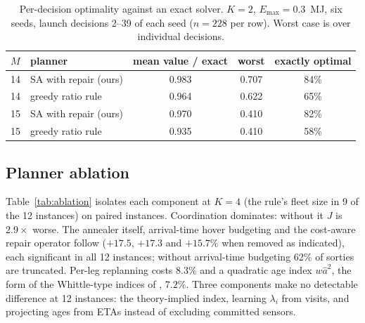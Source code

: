 \documentclass[journal,outdir=./]{IEEEtran}
\newcommand{\Emax}{E_{\max}}
\begin{document}
\begin{table}[t]\centering
\footnotesize\setlength{\tabcolsep}{3pt}
\caption{Per-decision optimality against an exact solver. $K=2$, $\Emax=0.3$~MJ, six seeds, launch decisions 2--39 of each seed ($n=228$ per row). Worst case is over individual decisions.}
\label{tab:cert}
\begin{tabular}{llccc}
\toprule
$M$ & planner & mean value / exact & worst & exactly optimal\\
\midrule
14 & SA with repair (ours) & 0.983 & 0.707 & 84\%\\
14 & greedy ratio rule & 0.964 & 0.622 & 65\%\\
15 & SA with repair (ours) & 0.970 & 0.410 & 82\%\\
15 & greedy ratio rule & 0.935 & 0.410 & 58\%\\
\bottomrule
\end{tabular}
\end{table}

\subsection{Planner ablation}\label{sec:planner:abl}
Table~\ref{tab:ablation} isolates each component at $K=4$ (the rule's fleet size in 9 of the 12 instances) on paired instances. Coordination dominates: without it $J$ is $2.9\times$ worse. The annealer itself, arrival-time hover budgeting and the cost-aware repair operator follow ($+17.5$, $+17.3$ and $+15.7\%$ when removed as indicated), each significant in all 12 instances; without arrival-time budgeting 62\% of sorties are truncated. Per-leg replanning costs $8.3\%$ and a quadratic age index $w\hat a^2$, the form of the Whittle-type indices of \cite{kadota2018scheduling}, $7.2\%$. Three components make no detectable difference at 12 instances: the theory-implied index, learning $\lambda_i$ from visits, and projecting ages from ETAs instead of excluding committed sensors.
\end{document}
